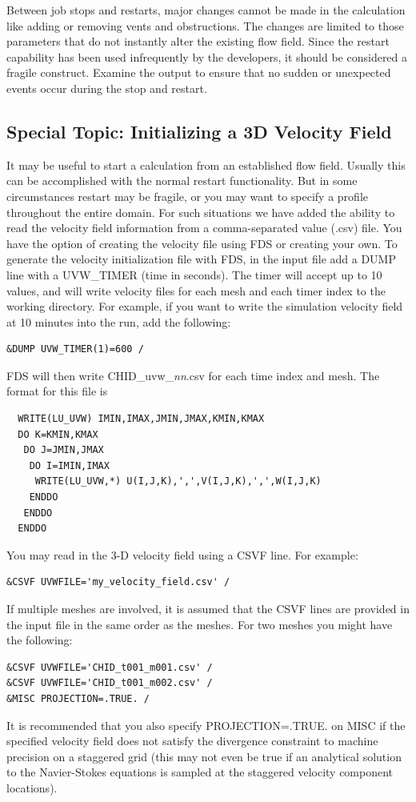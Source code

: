 \documentclass[11pt]{book}
\begin{document}
Between job stops and restarts, major changes cannot be made in the calculation like adding or removing vents and obstructions. The changes are limited to those parameters that do not instantly alter the existing flow field. Since the restart capability has been used infrequently by the developers, it should be considered a fragile construct. Examine the output to ensure that no sudden or unexpected events occur during the stop and restart.


\subsection{Special Topic: Initializing a 3D Velocity Field}
\label{info:velo_restart}
\label{info:CSVF}

It may be useful to start a calculation from an established flow field.  Usually this can be accomplished with the normal restart functionality.  But in some circumstances restart may be fragile, or you may want to specify a profile throughout the entire domain.  For such situations we have added the ability to read the velocity field information from a comma-separated value (.csv) file.  You have the option of creating the velocity file using FDS or creating your own.  To generate the velocity initialization file with FDS, in the input file add a {\ct DUMP} line with a {\ct UVW\_TIMER} (time in seconds).  The timer will accept up to 10 values, and will write velocity files for each mesh and each timer index to the working directory.  For example, if you want to write the simulation velocity field at 10 minutes into the run, add the following:
\begin{lstlisting}
&DUMP UVW_TIMER(1)=600 /
\end{lstlisting}
FDS will then write {\ct CHID\_uvw\_{\it nn}.csv} for each time index and mesh.  The format for this file is
\begin{lstlisting}
  WRITE(LU_UVW) IMIN,IMAX,JMIN,JMAX,KMIN,KMAX
  DO K=KMIN,KMAX
   DO J=JMIN,JMAX
    DO I=IMIN,IMAX
     WRITE(LU_UVW,*) U(I,J,K),',',V(I,J,K),',',W(I,J,K)
    ENDDO
   ENDDO
  ENDDO
\end{lstlisting}
You may read in the 3-D velocity field using a {\ct CSVF} line.  For example:
\begin{lstlisting}
&CSVF UVWFILE='my_velocity_field.csv' /
\end{lstlisting}
If multiple meshes are involved, it is assumed that the {\ct CSVF} lines are provided in the input file in the same order as the meshes. For two meshes you might have the following:
\begin{lstlisting}
&CSVF UVWFILE='CHID_t001_m001.csv' /
&CSVF UVWFILE='CHID_t001_m002.csv' /
&MISC PROJECTION=.TRUE. /
\end{lstlisting}
It is recommended that you also specify {\ct PROJECTION=.TRUE.} on {\ct MISC} if the specified velocity field does not satisfy the divergence constraint to machine precision on a staggered grid (this may not even be true if an analytical solution to the Navier-Stokes equations is sampled at the staggered velocity component locations).
\end{document}
